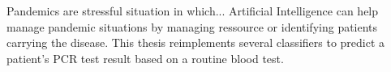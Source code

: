 Pandemics are stressful situation in which...
Artificial Intelligence can help manage pandemic situations by managing 
ressource or identifying patients carrying the disease. This thesis 
reimplements several classifiers to predict a patient's PCR test result based 
on a routine blood test.
